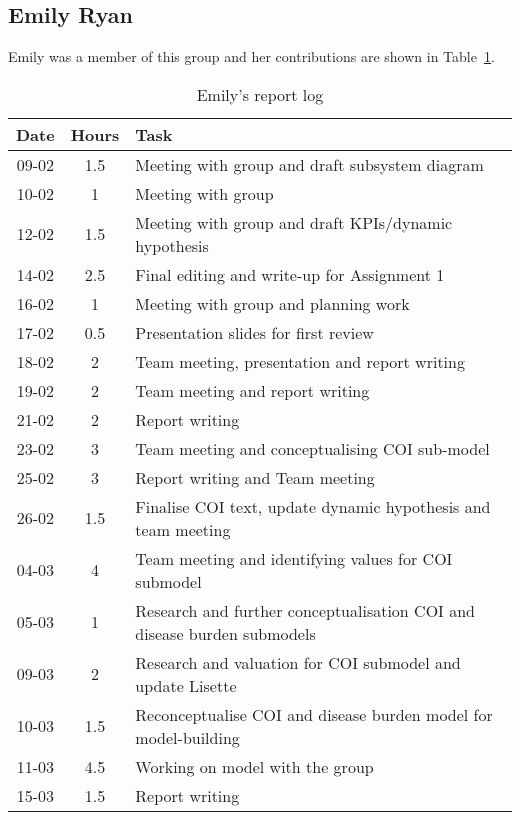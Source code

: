
\subsection{Emily Ryan}
Emily was a member of this group and her contributions are shown in Table~\ref{tab:emily_log}. 
\begin{longtable}[c]{c|c|m{35em}}
\caption{Emily's report log}
\label{tab:emily_log}\\
\textbf{Date}& \textbf{Hours} & \textbf{Task} \\
\hline
\endfirsthead
%
\endhead
%
 09-02 & 1.5 & Meeting with group and draft subsystem diagram  \\
 10-02 & 1 & Meeting with group  \\
 12-02 & 1.5 & Meeting with group and draft KPIs/dynamic hypothesis  \\
 14-02 & 2.5 & Final editing and write-up for Assignment 1\\
 16-02 & 1 & Meeting with group and planning work\\
 17-02 & 0.5 & Presentation slides for first review\\
 18-02 & 2 & Team meeting, presentation and report writing\\
 19-02 & 2 & Team meeting and report writing\\
 21-02 & 2 & Report writing\\
 23-02 & 3 & Team meeting and conceptualising COI sub-model\\
 25-02 & 3 & Report writing and Team meeting\\
 26-02 & 1.5 & Finalise COI text, update dynamic hypothesis and team meeting\\
 04-03 & 4 & Team meeting and identifying values for COI submodel\\
 05-03 & 1 & Research and further conceptualisation COI and disease burden submodels\\
 09-03 & 2 & Research and valuation for COI submodel and update Lisette\\
 10-03 & 1.5 & Reconceptualise COI and disease burden model for model-building \\
 11-03 &  4.5 & Working on model with the group \\
 15-03 & 1.5 & Report writing \\

\end{longtable}
